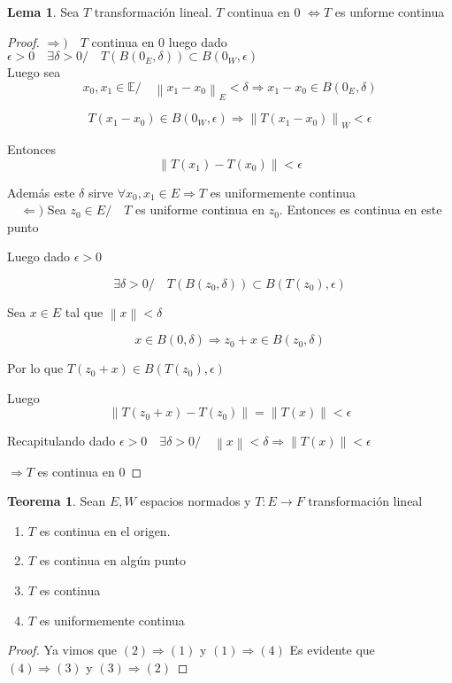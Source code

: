 \documentclass[12pt]{article}
\newcommand{\E}{\mathbb{E}}
\newcommand{\Ra}{\Rightarrow}
\newcommand{\ra}{\rightarrow}
\newcommand{\norm}[1]{\left\lVert#1\right\rVert}
\theoremstyle{definition}
\newtheorem{theorem}{Teorema}
\newtheorem{lemm}{Lema}
\begin{document}
\begin{lemm}
  Sea $T$ transformación lineal. $T$ continua en 0 $\iff T$ es unforme continua 	
	\begin{proof}
  		$\Ra ) \quad T$ continua en 0 luego dado $\epsilon > 0 \quad \exists \delta > 0 / \quad T(B(0_{E},\delta)) \subset B(0_{W},\epsilon)$\\

    Luego sea $$ x_{0} ,x_{1} \in \E / \quad \norm{x_{1}-x_{0}}_{E} < \delta \Ra  x_{1}-x_{0} \in B(0_{E},\delta)$$

    $$T(x_{1}-x_{0}) \in B(0_{W},\epsilon) \Ra \norm {T(x_{1}-x_{0})}_{W} < \epsilon $$

    Entonces $$\norm{T(x_{1}) - T(x_{0})} < \epsilon$$ 

    Además este $\delta$ sirve $\forall x_{0},x_{1} \in E \Ra T$ es uniformemente continua \\
	
$\quad \Leftarrow)$ Sea $z_{0} \in E / \quad T$ es uniforme continua en $z_{0}$. Entonces es continua en este punto 

	Luego dado $\epsilon > 0$ 

	$$ \exists \delta > 0 / \quad T(B(z_{0},\delta)) \subset B(T(z_{0}),\epsilon )$$

	Sea $x \in E $ tal que $\norm{x} < \delta$ 

	$$ x \in B(0,\delta) \Ra  z_{0} + x \in B(z_{0},\delta ) $$

      Por lo que $T(z_{0} + x) \in B(T(z_{0}),\epsilon)$

      Luego $$\norm{T(z_{0} + x) - T(z_{0})} = \norm{T(x)} < \epsilon  $$

      Recapitulando dado $\epsilon > 0 \quad \exists \delta > 0 / \quad \norm{x} < \delta \Ra \norm{T(x)} < \epsilon $

      $\Ra T$ es continua en 0

  \end{proof}
  \end{lemm}
  \begin{theorem}
    Sean $E,W$ espacios normados y $T:E \ra F$ transformación lineal
    \begin{enumerate}
      	 \item $T$ es continua en el origen.
	 \item $T$ es continua en algún punto
	 \item $T$ es continua
	 \item $T$ es uniformemente continua 
    \end{enumerate}

    \begin{proof}
      Ya vimos que $(2) \Ra (1)$ y $(1) \Ra (4)$
      Es evidente que $(4) \Ra (3)$ y $(3) \Ra (2)$
    \end{proof}
\end{theorem}
\end{document}
